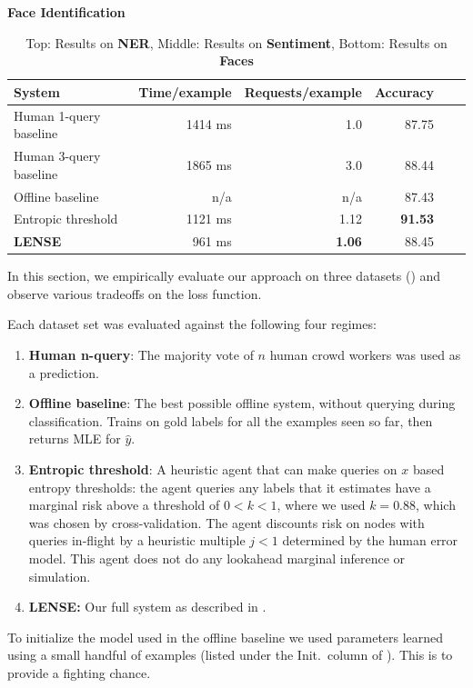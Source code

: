 \begin{table}[ht]
{\bf Face Identification}\\
\begin{tabular}{l  r  r  r  r  r}
    \textbf{System} & \textbf{Time/example} & \textbf{Requests/example} & \textbf{Accuracy} \\ \hline
    Human 1-query baseline & 1414 ms & 1.0 & 87.75 \\ %
    Human 3-query baseline & 1865 ms & 3.0 & 88.44 \\ %
    Offline baseline & n/a & n/a & 87.43 \\    %
    Entropic threshold & 1121 ms & 1.12 & \textbf{91.53} \\ %
    \textbf{LENSE} & 961 ms & \textbf{1.06} & 88.45 \\   %
\end{tabular}
  \caption{Top: Results on {\bf NER}, Middle: Results on {\bf Sentiment}, Bottom: Results on {\bf Faces}}
\end{table}

In this section, we empirically evaluate our approach on three datasets () and observe various tradeoffs on the loss function.

Each dataset set was evaluated against the following four regimes:
\begin{enumerate}
  \item {\bf Human n-query}: The majority vote of $n$ human crowd workers was used as a prediction.
  \item {\bf Offline baseline}: The best possible offline system, without querying during classification. Trains on gold labels for all the examples seen so far, then returns MLE for $\hat{y}$.
  \item {\bf Entropic threshold}: A heuristic agent that can make queries on $x$ based entropy thresholds: the agent queries any labels that it estimates have a marginal risk above a threshold of $0 < k < 1$, where we used $k = 0.88$, which was chosen by cross-validation. The agent discounts risk on nodes with queries in-flight by a heuristic multiple $j < 1$ determined by the human error model. This agent does not do any lookahead marginal inference or simulation.
  \item {\bf LENSE:} Our full system as described in .
\end{enumerate}

To initialize the model used in the offline baseline we used parameters learned using a small handful of examples (listed under the Init.\ column of ). This is to provide a fighting chance.

